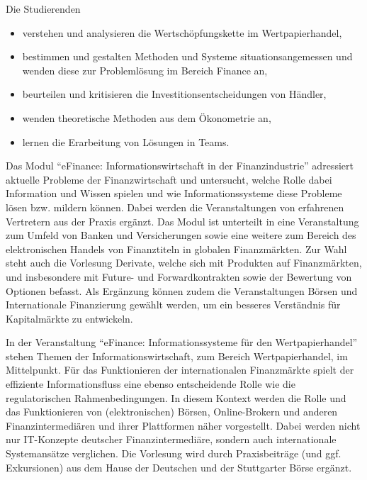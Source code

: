 \begin{module}
\begin{styleenv}
\begin{conditions}
 \end{conditions}


\end{styleenv}

\begin{learningoutcomes}
 

Die Studierenden

 \begin{itemize}\item verstehen und analysieren die Wertschöpfungskette im Wertpapierhandel,  \item bestimmen und gestalten Methoden und Systeme situationsangemessen und wenden diese zur Problemlösung im Bereich Finance an,  \item beurteilen und kritisieren die Investitionsentscheidungen von Händler,  \item wenden theoretische Methoden aus dem Ökonometrie an,  \item lernen die Erarbeitung von Lösungen in Teams.  \end{itemize}
\end{learningoutcomes}

\begin{content}
Das Modul “eFinance: Informationswirtschaft in der Finanzindustrie” adressiert aktuelle Probleme der Finanzwirtschaft und untersucht, welche Rolle dabei Information und Wissen spielen und wie Informationssysteme diese Probleme lösen bzw. mildern können. Dabei werden die Veranstaltungen von erfahrenen Vertretern aus der Praxis ergänzt. Das Modul ist unterteilt in eine Veranstaltung zum Umfeld von Banken und Versicherungen sowie eine weitere zum Bereich des elektronischen Handels von Finanztiteln in globalen Finanzmärkten. Zur Wahl steht auch die Vorlesung Derivate, welche sich mit Produkten auf Finanzmärkten, und insbesondere mit Future- und Forwardkontrakten sowie der Bewertung von Optionen befasst. Als Ergänzung können zudem die Veranstaltungen Börsen und Internationale Finanzierung gewählt werden, um ein besseres Verständnis für Kapitalmärkte zu entwickeln.

 

In der Veranstaltung “eFinance: Informationssysteme für den Wertpapierhandel” stehen Themen der Informationswirtschaft, zum Bereich Wertpapierhandel, im Mittelpunkt. Für das Funktionieren der internationalen Finanzmärkte spielt der effiziente Informationsfluss eine ebenso entscheidende Rolle wie die regulatorischen Rahmenbedingungen. In diesem Kontext werden die Rolle und das Funktionieren von (elektronischen) Börsen, Online-Brokern und anderen Finanzintermediären und ihrer Plattformen näher vorgestellt. Dabei werden nicht nur IT-Konzepte deutscher Finanzintermediäre, sondern auch internationale Systemansätze verglichen. Die Vorlesung wird durch Praxisbeiträge (und ggf. Exkursionen) aus dem Hause der Deutschen und der Stuttgarter Börse ergänzt.



\end{content}
\end{module}
